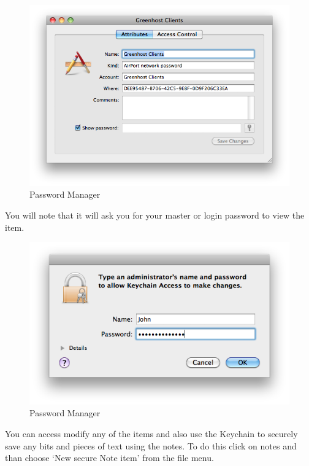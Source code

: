 \begin{figure}[htbp]
\centering
\includegraphics{mng_16.png}
\caption{Password Manager}
\end{figure}

You will note that it will ask you for your master or login password to
view the item.

\begin{figure}[htbp]
\centering
\includegraphics{mng_17.png}
\caption{Password Manager}
\end{figure}

You can access modify any of the items and also use the Keychain to
securely save any bits and pieces of text using the notes. To do this
click on notes and than choose `New secure Note item' from the file
menu.

